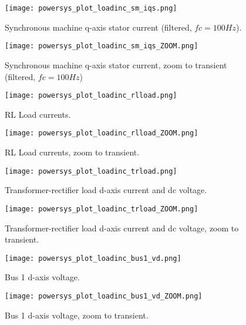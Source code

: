 \begin{figure}[h]
    \centering
    \texttt{[image: powersys\_plot\_loadinc\_sm\_iqs.png]}
    \caption{Synchronous machine q-axis stator current (filtered, $fc=100 Hz$).}
    \label{fig:powersys_plot_loadinc_sm_iqs}
\end{figure}

\begin{figure}[h]
    \centering
    \texttt{[image: powersys\_plot\_loadinc\_sm\_iqs\_ZOOM.png]}
    \caption{Synchronous machine q-axis stator current, zoom to transient (filtered, $fc=100 Hz$)}
    \label{fig:powersys_plot_loadinc_sm_iqs_ZOOM}
\end{figure}

\begin{figure}[h]
    \centering
    \texttt{[image: powersys\_plot\_loadinc\_rlload.png]}
    \caption{RL Load currents.}
    \label{fig:powersys_plot_loadinc_rlload}
\end{figure}

\begin{figure}[h]
    \centering
    \texttt{[image: powersys\_plot\_loadinc\_rlload\_ZOOM.png]}
    \caption{RL Load currents, zoom to transient.}
    \label{fig:powersys_plot_loadinc_rlload_ZOOM}
\end{figure}

\begin{figure}[h]
    \centering
    \texttt{[image: powersys\_plot\_loadinc\_trload.png]}
    \caption{Transformer-rectifier load d-axis current and dc voltage.}
    \label{fig:powersys_plot_loadinc_trload}
\end{figure}

\begin{figure}[h]
    \centering
    \texttt{[image: powersys\_plot\_loadinc\_trload\_ZOOM.png]}
    \caption{Transformer-rectifier load d-axis current and dc voltage, zoom to transient.}
    \label{fig:powersys_plot_loadinc_trload_ZOOM}
\end{figure}

\begin{figure}[h]
    \centering
    \texttt{[image: powersys\_plot\_loadinc\_bus1\_vd.png]}
    \caption{Bus 1 d-axis voltage.}
    \label{fig:powersys_plot_loadinc_bus1_vd}
\end{figure}

\begin{figure}[h]
    \centering
    \texttt{[image: powersys\_plot\_loadinc\_bus1\_vd\_ZOOM.png]}
    \caption{Bus 1 d-axis voltage, zoom to transient.}
    \label{fig:powersys_plot_loadinc_bus1_vd_ZOOM}
\end{figure}

